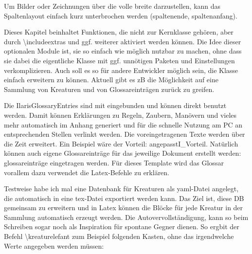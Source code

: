 \documentclass{Ilaris}
\begin{document}
Um Bilder oder Zeichnungen über die volle breite darzustellen, kann das Spaltenlayout einfach kurz unterbrochen werden (spaltenende, spaltenanfang).
\spaltenende
{}
\spaltenanfang

Dieses Kapitel beinhaltet Funktionen, die nicht zur Kernklasse gehören, aber durch \textbackslash include{extras} und ggf. weiterer  aktiviert werden können. Die Idee dieser optionalen Module ist, sie so einfach wie möglich nutzbar zu machen, ohne dass sie dabei die eigentliche Klasse mit ggf. unnötigen Paketen und Einstellungen verkomplizieren. Auch soll es so für andere Entwickler möglich sein, die Klasse einfach erweitern zu können. Aktuell gibt es zB die Möglichkeit auf eine Sammlung von Kreaturen und von Glossareinträgen zurück zu greifen.

Die IlarisGlossaryEntries sind mit eingebunden und können direkt benutzt werden. Damit können Erklärungen zu Regeln, Zaubern, Manövern und vieles mehr automatisch im Anhang generiert und für die schnelle Nutzung am PC an entsprechenden Stellen verlinkt werden. Die voreingetragenen Texte werden über die Zeit erweitert. Ein Beispiel wäre der Vorteil:
\gls{angepasstI_Vorteil}.
Natürlich können auch eigene Glossareinträge für das jeweilige Dokument erstellt werden:
\gls{glossareinträge} eingetragen werden.
Für dieses Template wird das Glossar vorallem dazu verwendet die Latex-Befehle zu erklären.



\spaltenumbruch

Testweise habe ich mal eine Datenbank für Kreaturen als yaml-Datei angelegt, die automatisch in eine tex-Datei exportiert werden kann. Das Ziel ist, diese DB gemeinsam zu erweitern und in Latex können die Blöcke für jede Kreatur in der Sammlung automatisch erzeugt werden. Die Autovervollständigung, kann so beim Schreiben sogar noch als Inspiration für spontane Gegner dienen. So ergbit der Befehl \textbackslash kreaturelefant zum Beispiel folgenden Kasten, ohne das irgendwelche Werte angegeben werden müssen:
\end{document}
